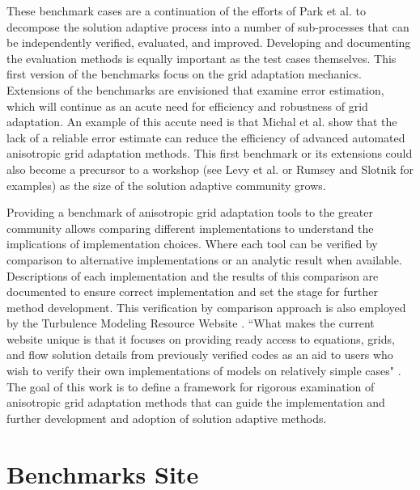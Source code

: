 \documentclass[3p,times,procedia,number]{elsarticle}
\begin{document}
These benchmark cases are a continuation of the efforts of
Park et al. \cite{park-loseille-krakos-michal-adapt-decomposition}
to decompose the solution adaptive process into a number of
sub-processes that can be independently verified, evaluated, and improved.
Developing and documenting the evaluation methods is equally important
as the test cases themselves.
This first version of the benchmarks focus on the grid adaptation
mechanics.
Extensions of the benchmarks are envisioned that examine error
estimation, which will continue as an acute need for
efficiency and robustness of grid adaptation.
An example of this accute need is that
Michal et al. \cite{michal-unstruct-adapt-epic-dpw6} show that
the lack of a reliable error estimate can reduce the efficiency of advanced
automated anisotropic grid adaptation methods.
This first benchmark or its extensions could also become a
precursor to a workshop (see Levy et al. \cite{dpw5-summary} or
Rumsey and Slotnik \cite{rumsey-slotnick-summary-highliftpw2} for examples)
as the size of the solution adaptive community grows.

Providing a benchmark
of anisotropic grid adaptation tools
to the greater community
allows comparing different implementations
to understand the implications of implementation choices.
Where each tool can be verified
by comparison to alternative implementations or
an analytic result when available.
Descriptions of each implementation and the
results of this comparison are documented to ensure correct implementation
and set the stage for further method development.
This verification by comparison approach is also employed by the
Turbulence Modeling Resource Website \cite{rumsey-smith-huang-turbmodels-description}.
``What makes the current website unique is that it focuses on
providing ready access to equations, grids, and flow solution details
from previously verified codes as an aid to users
who wish to verify their own implementations of models on
relatively simple cases" \cite{rumsey-smith-huang-turbmodels-description}.
The goal of this work is to define a framework for
rigorous examination of anisotropic grid adaptation methods
that can guide the implementation and
further development and adoption of solution adaptive methods.

\section{Benchmarks Site}
\end{document}
